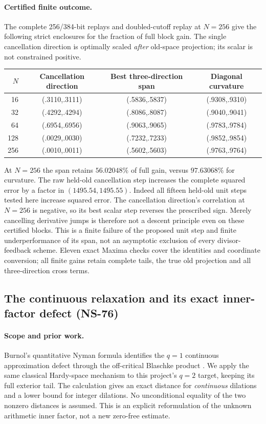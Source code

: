 \documentclass[11pt]{article}
\theoremstyle{remark}
\begin{document}
\paragraph{Certified finite outcome.}
The complete 256/384-bit replays and doubled-cutoff replay at $N=256$
give the following strict enclosures for the fraction of full block gain.
The single cancellation direction is optimally scaled \emph{after} old-space
projection; its scalar is not constrained positive.
\begin{center}
\begin{tabular}{rccc}
\hline
$N$&Cancellation direction&Best three-direction span&Diagonal curvature\\
\hline
16&(.3110,.3111)&(.5836,.5837)&(.9308,.9310)\\
32&(.4292,.4294)&(.8086,.8087)&(.9040,.9041)\\
64&(.6954,.6956)&(.9063,.9065)&(.9783,.9784)\\
128&(.0029,.0030)&(.7232,.7233)&(.9852,.9854)\\
256&(.0010,.0011)&(.5602,.5603)&(.9763,.9764)\\
\hline
\end{tabular}
\end{center}
At $N=256$ the span retains $56.02048\%$ of full gain, versus
$97.63068\%$ for curvature. The raw held-old cancellation step increases
the complete squared error by a factor in $(1495.54,1495.55)$.
Indeed all fifteen held-old unit steps tested here increase squared error.
The cancellation direction's correlation at $N=256$ is negative, so its
best scalar step reverses the prescribed sign. Merely cancelling derivative
jumps is therefore not a descent principle even on these certified blocks.
This is a finite failure of the proposed unit step and finite underperformance
of its span, not an asymptotic exclusion of every divisor-feedback scheme.
Eleven exact Maxima checks cover the identities and coordinate conversion;
all finite gains retain complete tails, the true old projection and all
three-direction cross terms.

\subsection{The continuous relaxation and its exact inner-factor defect (NS-76)}
\label{sec:ns76-inner-distance}

\paragraph{Scope and prior work.}
Burnol's quantitative Nyman formula identifies the $q=1$ continuous
approximation defect through the off-critical Blaschke product
\cite[Theorem 1.2 and Lemma 2.4]{BurnolNyman2001}. We apply the same
classical Hardy-space mechanism to this project's $q=2$ target, keeping
its full exterior tail. The calculation gives an exact distance for
\emph{continuous} dilations and a lower bound for integer dilations.
No unconditional equality of the two nonzero distances is assumed.
This is an explicit reformulation of the unknown arithmetic inner
factor, not a new zero-free estimate.
\end{document}
